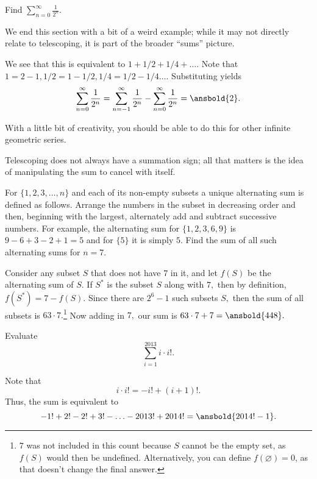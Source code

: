 \documentclass[mast]{lucky}
\begin{document}
\begin{exam}
Find $\sum\limits_{n=0}^{\infty} \frac{1}{2^n}.$
\end{exam}

We end this section with a bit of a weird example; while it may not directly relate to telescoping, it is part of the broader ``sums'' picture.

\begin{sol}
We see that this is equivalent to $1+1/2+1/4+\dots.$ Note that $1=2-1,1/2=1-1/2,1/4=1/2-1/4\dots.$ Substituting yields \[\sum\limits_{n=0}^{\infty}\frac{1}{2^n}=\sum\limits_{n=-1}^{\infty} \frac{1}{2^n}-\sum\limits_{n=0}^{\infty}\frac{1}{2^n}=\ansbold{2}.\]

With a little bit of creativity, you should be able to do this for other infinite geometric series.
\end{sol}

Telescoping does not always have a summation sign; all that matters is the idea of manipulating the sum to cancel with itself.

\begin{exam}[AIME 1983/13]
For $\{1, 2, 3, \ldots, n\}$ and each of its non-empty subsets a unique alternating sum is defined as follows. Arrange the numbers in the subset in decreasing order and then, beginning with the largest, alternately add and subtract successive numbers. For example, the alternating sum for $\{1, 2, 3, 6,9\}$ is $9-6+3-2+1=5$ and for $\{5\}$ it is simply $5$. Find the sum of all such alternating sums for $n=7$. 
\end{exam}

\begin{sol}
Consider any subset $S$ that does not have $7$ in it, and let $f(S)$ be the alternating sum of $S$. If $S^{*}$ is the subset $S$ along with $7,$ then by definition, $f(S^*)=7-f(S).$ Since there are $2^6-1$ such subsets $S,$ then the sum of all subsets  is $63\cdot 7.$\footnote{$7$ was not included in this count because $S$ cannot be the empty set, as $f(S)$ would then be undefined. Alternatively, you can define $f(\varnothing)=0$, as that doesn't change the final answer.} Now adding in $7,$ our sum is $63\cdot 7+7=\ansbold{448}.$
\end{sol}

\begin{exam}[LMT 2014/I15]
Evaluate
\[\sum_{i=1}^{2013} i\cdot i!.\]
\end{exam}

\begin{sol}
Note that
\[i\cdot i! = -i!+(i+1)!.\]
Thus, the sum is equivalent to
\[-1!+2!-2!+3!-\ldots-2013!+2014! = \ansbold{2014!-1}.\]
\end{sol}
\end{document}
